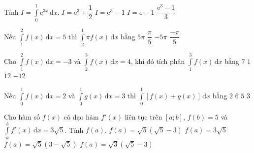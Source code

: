 \begin{ex}%
	Tính $I = \displaystyle\int\limits_0^1 \mathrm{e}^{3x} \mathrm{\,d}x$.
	\choice
	{ $I = \mathrm{e}^3 + \dfrac{1}{2}$}
	{ $I = \mathrm{e}^3 - 1$}
	{ $I = \mathrm{e} - 1$}
	{ $\dfrac{\mathrm{e}^3 - 1}{3}$}
\end{ex}
\begin{ex}%
	Nếu $\displaystyle\int\limits_1^2 f(x)\mathrm{\,d}x = 5$ thì $\displaystyle\int\limits_2^1 \pi f(x)\mathrm{\,d}x$ bằng
	\choice
	{ $5\pi $}
	{ $\dfrac{\pi}{5}$}
	{\True $-5\pi $}
	{ $\dfrac{-\pi }{5}$}
\end{ex}
\begin{ex}%
	Cho $\displaystyle\int\limits_1^2 f(x)\mathrm{\,d}x = -3$ và $\displaystyle\int\limits_2^3 f(x)\mathrm{\,d}x = 4$, khi đó tích phân $\displaystyle\int\limits_1^3 f(x)\mathrm{\,d}x$ bằng
	\choice
	{$7$}
	{\True $1$}
	{$12$}
	{$-12$}
\end{ex}
\begin{ex}%
	Nếu $\displaystyle\int\limits_0^1 f(x)\mathrm{\,d}x = 2$ và $\displaystyle\int\limits_0^1 g(x)\mathrm{\,d}x = 3$ thì $\displaystyle\int\limits_0^1 \left[f(x) + g(x)\right]\mathrm{\,d}x$ bằng
	\choice
	{ $2$}
	{ $6$}
	{\True $5$}
	{ $3$}
\end{ex}
\begin{ex}%
	Cho hàm số $f(x)$ có đạo hàm $f'(x)$ liên tục trên $[a; b]$, $f(b) = 5$ và $\displaystyle\int\limits_a^b f'(x)\mathrm{\,d}x = 3\sqrt{5}$. Tính $f(a)$.
	\choice
	{\True $f(a) = \sqrt {5}\left(\sqrt{5} - 3\right)$}
	{$f(a) = 3\sqrt{5}$}
	{$f(a) = \sqrt{5}\left(3 - \sqrt{5}\right)$}
	{$f(a) = \sqrt{3}\left(\sqrt{5} - 3\right)$}
\end{ex}
